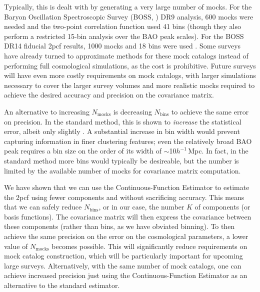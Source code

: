 \documentclass[modern]{aastex62}
\newcommand{\cf}{2pcf\xspace} %
\newcommand{\est}{the Continuous-Function Estimator\xspace}
\newcommand{\hmpc}{$h^{-1}\,$Mpc}
\newcommand{\NN}[1]{N_\mathrm{#1}}
\newcommand{\KSF}[1]{\textcolor{teal}{KSF says: #1}}
\begin{document}
Typically, this is dealt with by generating a very large number of mocks.
For the Baryon Oscillation Spectroscopic Survey (BOSS, \citealt{Dawson2013}) DR9 analysis, 600 mocks were needed and the two-point correlation function used 41 bins \citep{Sanchez2012} (though they also perform a restricted 15-bin analysis over the BAO peak scales). 
For the BOSS DR14 fiducial \cf results, 1000 mocks and 18 bins were used \cite{Ata2017}.
Some surveys have already turned to approximate methods for these mock catalogs instead of performing full cosmological simulations, as the cost is prohibitive.
Future surveys will have even more costly requirements on mock catalogs, with larger simulations necessary to cover the larger survey volumes and more realistic mocks required to achieve the desired accuracy and precision on the covariance matrix.


An alternative to increasing $\NN{mocks}$ is decreasing $\NN{bins}$ to achieve the same error on precision.
In the standard method, this is shown to \emph{increase} the statistical error, albeit only slightly \citep{Percival2014}.
A substantial increase in bin width would prevent capturing information in finer clustering features; even the relatively broad BAO peak requires a bin size on the order of its width of $\sim$10\hmpc.
In fact, in the standard method more bins would typically be desireable, but the number is limited by the available number of mocks for covariance matrix computation.

We have shown that we can use \est to estimate the \cf using fewer components and without sacrificing accuracy.
This means that we can safely reduce $\NN{bins}$, or in our case, the number $K$ of components (or basis functions).
The covariance matrix will then express the covariance between these components (rather than bins, as we have obviated binning).
To then achieve the same precision on the error on the cosmological parameters, a lower value of $\NN{mocks}$ becomes possible.
This will significantly reduce requirements on mock catalog construction, which will be particularly important for upcoming large surveys. 
Alternatively, with the same number of mock catalogs, one can achieve increased precision just using \est as an alternative to the standard estimator.
\end{document}
